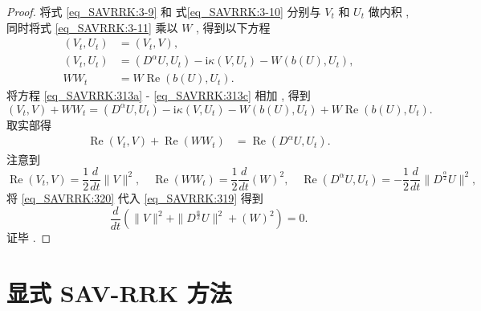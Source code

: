 \begin{proof}
	将式 \eqref{eq_SAVRRK:3-9} 和 式\eqref{eq_SAVRRK:3-10} 分别与 $V_t$ 和 $U_t$ 做内积 , 
	同时将式 \eqref{eq_SAVRRK:3-11} 乘以 $W$ , 得到以下方程
\begin{align}
\left(V_t , U_t\right)&=\left(V_t , V\right) , \label{eq_SAVRRK:313a}\\
\left(V_t , U_t\right)&=\left(D^{\alpha} U , U_t\right)-\mathrm{i} \kappa\left(V , U_t\right)-W\left(b(U) , U_t\right) , \label{eq_SAVRRK:313b}\\
W W_t&=W\operatorname{Re}\left(b(U) , U_t\right) . \label{eq_SAVRRK:313c}
\end{align}
将方程 \eqref{eq_SAVRRK:313a} - \eqref{eq_SAVRRK:313c} 相加 , 得到
\begin{equation}
\left(V_t , V\right) + W W_t= \left(D^{\alpha} U , U_t\right)-\mathrm{i} \kappa\left(V , U_t\right)-W\left(b(U) , U_t\right) + W\operatorname{Re}\left(b(U) , U_t\right) . 
\end{equation}
取实部得
\begin{align}
\operatorname{Re}\left(V_t , V\right) + \operatorname{Re}\left(W W_t\right)&= \operatorname{Re}\left(D^{\alpha} U , U_t\right) . \label{eq_SAVRRK:319}
\end{align}
注意到
\begin{equation}
\operatorname{Re}\left(V_t , V\right) = \frac{1}{2}\frac{d }{d t}\|V\|^2 , \quad \operatorname{Re}\left(W W_t\right) = \frac{1}{2}\frac{d }{d t}\left(W\right)^2 , \quad \operatorname{Re}\left(D^{\alpha} U , U_t\right)=-\frac{1}{2}\frac{d }{d t}\|D^\frac{\alpha}{2}U\|^2 , \label{eq_SAVRRK:320}
\end{equation}
将 \eqref{eq_SAVRRK:320} 代入 \eqref{eq_SAVRRK:319} 得到
\begin{equation}
\frac{d }{d t}\left(\|V\|^2+\|D^\frac{\alpha}{2}U\|^2+\left(W\right)^2\right)=0 . 
\end{equation}
证毕 . 
\end{proof}

\section{显式 SAV-RRK 方法}\label{Section_SAVRRK: 4}

